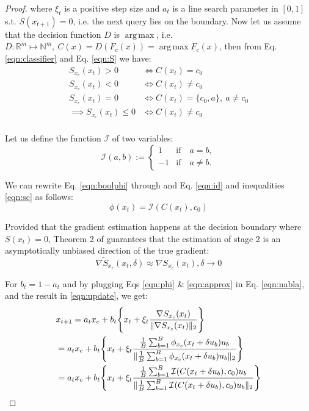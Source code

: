 \begin{proof}
where $\xi_t$ is a positive step size and $a_t$ is a line search parameter in $[0,1]$ s.t. $S(x_{t+1}) = 0$, i.e. the next query lies on the boundary.
Now let us assume that the decision function $D$ is $\operatorname*{arg\,max}$, i.e. $D: \mathbb{R}^m \mapsto \mathbb{N}^m, \:C(x) = D(F_c(x)) = \operatorname*{arg\,max} F_c(x)$, then from Eq. \ref{eqn:classifier} and Eq. \ref{eqn:S} we have:
\begin{equation}
\begin{aligned}
    S_{x_c}(x_t) > 0 & \iff C(x_t) = c_0\\
    S_{x_c}(x_t) < 0 & \iff C(x_t) \neq c_0\\
    S_{x_c}(x_t) = 0 & \iff C(x_t) = \{c_0,a\},\:a\neq c_0\\
    \implies S_{x_c}(x_t) \leq 0 & \iff C(x_t) \neq c_0\\
\end{aligned}
\label{eqn:sc}
\end{equation}

Let us define the function $\mathcal{I}$ of two variables:
\begin{equation}
    \mathcal{I}(a,b) :=
    \begin{cases}
    1 & \text{if} \quad a = b,\\
    -1 & \text{if} \quad a \neq b.
    \end{cases}
\label{eqn:id}
\end{equation}

We can rewrite Eq. \ref{eqn:boolphi} through and Eq. \ref{eqn:id} and inequalities \ref{eqn:sc} as follows: 
\begin{equation}
    \phi(x_t) = \mathcal{I}(C(x_t), c_0)
\label{eqn:phi}
\end{equation}

Provided that the gradient estimation happens at the decision boundary where $S(x_t) = 0$, Theorem 2 of \cite{chen2020hopskipjumpattack} guarantees that the estimation of stage 2 is an asymptotically unbiased direction of the true gradient:
\begin{equation}
  \widetilde{\nabla S_{x_c}}(x_t,\delta) \approx \nabla S_{x_c}(x_t), \delta \rightarrow 0
\label{eqn:approx}
\end{equation}

For $b_t = 1- a_t$ and by plugging Eqs \ref{eqn:phi} \& \ref{eqn:approx} in Eq. \ref{eqn:nabla}, and the result in \ref{eqn:update}, we get:
\begin{align}
    &x_{t+1} = a_{t}x_c + b_t\Biggl\{x_t + \xi_t \frac{\nabla S_{x_c}(x_t)}{\|\nabla S_{x_c}(x_t)\|_2}\Biggl\} \notag \\
    &= a_{t}x_c 
    + b_t\Biggl\{x_t + \xi_t \frac{\frac{1}{B} \sum_{b=1}^{B} \phi_{x_c}(x_t + \delta u_b)u_b}{\|\frac{1}{B} \sum_{b=1}^{B} \phi_{x_c}(x_t + \delta u_b)u_b\|_2}\Biggl\} \label{eqn:all} \\
    &= a_{t}x_c + b_t\Biggl\{x_t + \xi_t \frac{\frac{1}{B} \sum_{b=1}^{B} \mathcal{I}(C(x_t + \delta u_b), c_0)u_b}{\|\frac{1}{B} \sum_{b=1}^{B} \mathcal{I}(C(x_t + \delta u_b), c_0)u_b\|_2}\Biggl\} \notag
\end{align}


\end{proof}
